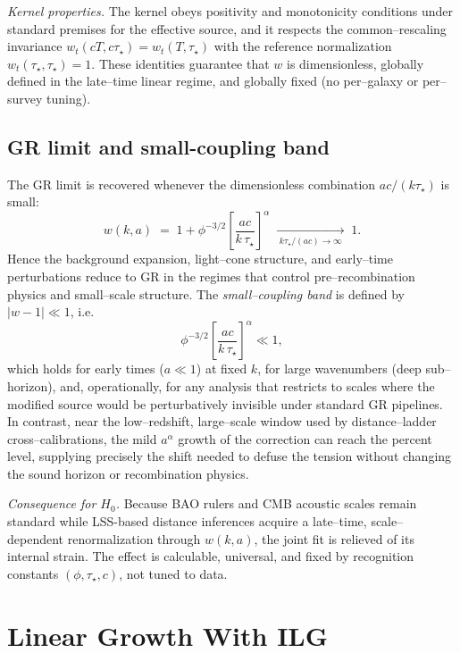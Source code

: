 \documentclass[11pt]{article}
\begin{document}
\medskip
\noindent\textit{Kernel properties.} The kernel obeys positivity and monotonicity conditions under standard premises for the effective source, and it respects the common–rescaling invariance \(w_t(cT,c\tau_\star)=w_t(T,\tau_\star)\) with the reference normalization \(w_t(\tau_\star,\tau_\star)=1\). These identities guarantee that \(w\) is dimensionless, globally defined in the late–time linear regime, and globally fixed (no per–galaxy or per–survey tuning).

\subsection{GR limit and small-coupling band}

The GR limit is recovered whenever the dimensionless combination \(a c/(k\tau_\star)\) is small:
\[
w(k,a)\;=\;1+\phi^{-3/2}\!\left[\frac{a c}{k\,\tau_\star}\right]^{\alpha}
\;\xrightarrow[\;k\tau_\star/(a c) \to \infty\;]{}\; 1.
\]
Hence the background expansion, light–cone structure, and early–time perturbations reduce to GR in the regimes that control pre–recombination physics and small–scale structure. The \emph{small–coupling band} is defined by \(|w-1|\ll 1\), i.e.
\[
\phi^{-3/2}\!\left[\frac{a c}{k\,\tau_\star}\right]^{\alpha}\ll 1,
\]
which holds for early times (\(a\ll 1\)) at fixed \(k\), for large wavenumbers (deep sub–horizon), and, operationally, for any analysis that restricts to scales where the modified source would be perturbatively invisible under standard GR pipelines. In contrast, near the low–redshift, large–scale window used by distance–ladder cross–calibrations, the mild \(a^\alpha\) growth of the correction can reach the percent level, supplying precisely the shift needed to defuse the tension without changing the sound horizon or recombination physics.

\medskip
\noindent\textit{Consequence for \(H_0\).} Because BAO rulers and CMB acoustic scales remain standard while LSS-based distance inferences acquire a late–time, scale–dependent renormalization through \(w(k,a)\), the joint fit is relieved of its internal strain. The effect is calculable, universal, and fixed by recognition constants \((\phi,\tau_\star,c)\), not tuned to data.

\section{Linear Growth With ILG}
\end{document}
